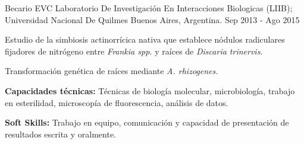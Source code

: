 \begin{cventries}
 \cventry
    {Becario EVC} %
    {Laboratorio De Investigación En Interacciones Biologicas (LIIB); Universidad Nacional De Quilmes} %
    {Buenos Aires, Argentina.} %
    {Sep 2013 - Ago 2015} %
    {
      \begin{cvitems} %
        \item {Estudio de la simbiosis actinorrícica nativa que establece nódulos radiculares fijadores de nitrógeno entre \textit{Frankia spp.} y raíces de \textit{Discaria trinervis}.}
        \item{Transformación genética de raíces mediante \textit{A. rhizogenes.}}
        \item {\textbf{Capacidades técnicas:} Técnicas de biología molecular, microbiología, trabajo en esterilidad, microscopía de fluorescencia, análisis de datos.}
        \item {\textbf{Soft Skills:} Trabajo en equipo, comunicación y capacidad de presentación de resultados escrita y oralmente.}
      \end{cvitems}
    }
\end{cventries}
